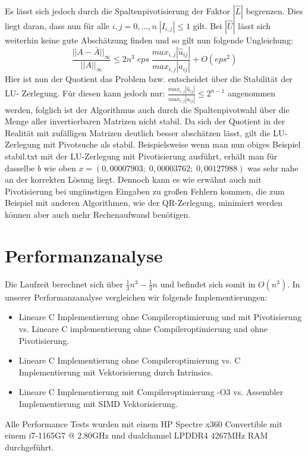 \documentclass[course=erap]{aspdoc}
\begin{document}
Es lässt sich jedoch durch die Spaltenpivotisierung der Faktor $|\hat{L}|$  begrenzen. 
Dies liegt daran, dass nun für alle $i,j = 0,...,n\; |I_{i,j}| \leq 1$ gilt. 
Bei $|\hat{U}|$ lässt sich weiterhin keine gute Abschätzung finden und so gilt nun folgende Ungleichung:  
  \begin{equation}
    \label{eg3}
    \frac{||A - \bar{A}||_\infty}{||A||_\infty} \leq 2n^3 \; eps \;\frac{max_{i,j}| \hat{u}_{ij}|}{max_{i,j}|a_{ij}|} + O(eps^2)
  \end{equation}
Hier ist nun der Quotient das Problem bzw. entscheidet über die Stabilität der LU-
Zerlegung. Für diesen kann jedoch nur: $\frac{max_{i,j}| \hat{u}_{ij}|}{max_{i,j}|a_{ij}|} \leq 2^{n-1}$ angenommen 
werden, folglich ist der Algorithmus auch durch die Spaltenpivotwahl über die Menge 
aller invertierbaren Matrizen nicht stabil. Da sich der Quotient in der Realität mit zufälligen Matrizen deutlich 
besser abschätzen lässt, gilt die LU-Zerlegung mit Pivotsuche als stabil.
Beispielsweise wenn man nun obiges Beispiel stabil.txt mit der LU-Zerlegung mit Pivotisierung ausführt, 
erhält man für dasselbe $b$ wie oben $x = (0,00007903;\; 0,00003762;\; 0,00127988)$ was sehr nahe an der korrekten Lösung liegt.
Dennoch kann es wie erwähnt auch mit Pivotisierung bei ungünstigen Eingaben zu großen Fehlern kommen, 
die zum Beispiel mit anderen Algorithmen, wie der QR-Zerlegung, minimiert werden können aber auch mehr Rechenaufwand benötigen.





\section{Performanzanalyse}
\label{Performanzanalyse}
Die Laufzeit berechnet sich über  $ \frac{1}{3}n^3 -\frac{1}{3} n $ und befindet sich somit in $O(n^3)$\cite[37, 38]{M2009}. 
In unserer Performanzanalyse vergleichen wir folgende Implementierungen:\\
\begin{itemize}
\item Lineare C Implementierung ohne Compileroptimierung und mit Pivotisierung vs. Lineare C implementierung ohne Compileroptimierung und ohne Pivotisierung. 
\item Lineare C Implementierung ohne Compileroptimierung vs. C Implementierung mit Vektorisierung durch Intrinsics. 
\item Lineare C Implementierung mit Compileroptimierung -O3 vs. Assembler Implementierung mit SIMD Vektorisierung.
\end{itemize}
Alle Performance Tests wurden mit einem HP Spectre x360 Convertible mit einem i7-1165G7 @ 2.80GHz und dualchannel LPDDR4 4267MHz RAM durchgeführt. 
\end{document}
